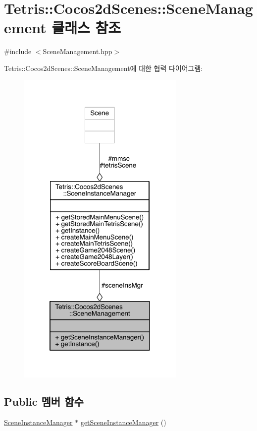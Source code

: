 \hypertarget{class_tetris_1_1_cocos2d_scenes_1_1_scene_management}{}\section{Tetris\+:\+:Cocos2d\+Scenes\+:\+:Scene\+Management 클래스 참조}
\label{class_tetris_1_1_cocos2d_scenes_1_1_scene_management}


{\ttfamily \#include $<$Scene\+Management.\+hpp$>$}



Tetris\+:\+:Cocos2d\+Scenes\+:\+:Scene\+Management에 대한 협력 다이어그램\+:
\nopagebreak
\begin{figure}[H]
\begin{center}
\leavevmode
\includegraphics[width=230pt]{d9/dd3/class_tetris_1_1_cocos2d_scenes_1_1_scene_management__coll__graph}
\end{center}
\end{figure}
\subsection*{Public 멤버 함수}
\begin{DoxyCompactItemize}
\item 
\hyperlink{class_tetris_1_1_cocos2d_scenes_1_1_scene_instance_manager}{Scene\+Instance\+Manager} $\ast$ \hyperlink{class_tetris_1_1_cocos2d_scenes_1_1_scene_management_a4a4ea58177afffd49857182c961eb5f3}{get\+Scene\+Instance\+Manager} ()
\end{DoxyCompactItemize}
